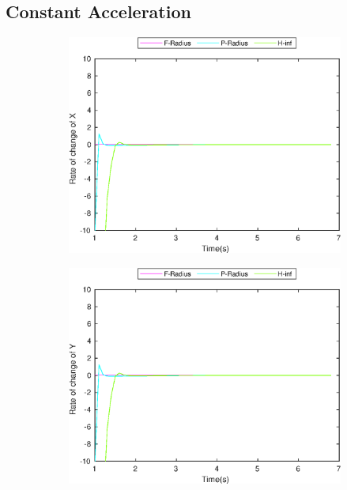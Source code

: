 \subsection{Constant Acceleration}
\FloatBarrier
\begin{figure}[!h]
\begin{subfigure}{.5\linewidth}
\centering
\includegraphics[width=\linewidth]{figures/BoundChange/CA/ca_bound_changeX}
\end{subfigure}
\begin{subfigure}{.5\linewidth}
\centering
\includegraphics[width=\linewidth]{figures/BoundChange/CA/ca_bound_changeY}

\end{subfigure}
\end{figure}
